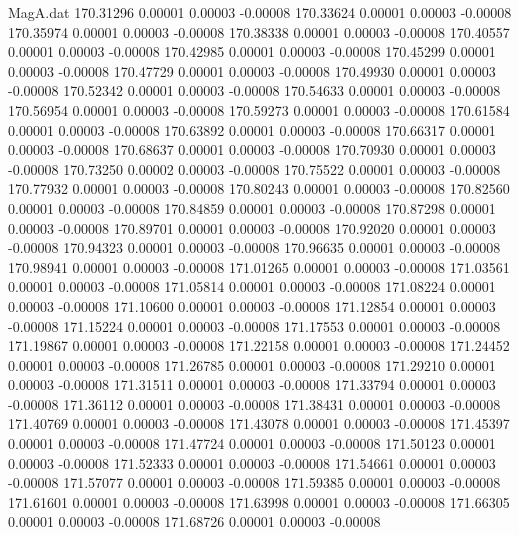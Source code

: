 \begin{filecontents}{MagA.dat}
 170.31296    0.00001    0.00003   -0.00008
 170.33624    0.00001    0.00003   -0.00008
 170.35974    0.00001    0.00003   -0.00008
 170.38338    0.00001    0.00003   -0.00008
 170.40557    0.00001    0.00003   -0.00008
 170.42985    0.00001    0.00003   -0.00008
 170.45299    0.00001    0.00003   -0.00008
 170.47729    0.00001    0.00003   -0.00008
 170.49930    0.00001    0.00003   -0.00008
 170.52342    0.00001    0.00003   -0.00008
 170.54633    0.00001    0.00003   -0.00008
 170.56954    0.00001    0.00003   -0.00008
 170.59273    0.00001    0.00003   -0.00008
 170.61584    0.00001    0.00003   -0.00008
 170.63892    0.00001    0.00003   -0.00008
 170.66317    0.00001    0.00003   -0.00008
 170.68637    0.00001    0.00003   -0.00008
 170.70930    0.00001    0.00003   -0.00008
 170.73250    0.00002    0.00003   -0.00008
 170.75522    0.00001    0.00003   -0.00008
 170.77932    0.00001    0.00003   -0.00008
 170.80243    0.00001    0.00003   -0.00008
 170.82560    0.00001    0.00003   -0.00008
 170.84859    0.00001    0.00003   -0.00008
 170.87298    0.00001    0.00003   -0.00008
 170.89701    0.00001    0.00003   -0.00008
 170.92020    0.00001    0.00003   -0.00008
 170.94323    0.00001    0.00003   -0.00008
 170.96635    0.00001    0.00003   -0.00008
 170.98941    0.00001    0.00003   -0.00008
 171.01265    0.00001    0.00003   -0.00008
 171.03561    0.00001    0.00003   -0.00008
 171.05814    0.00001    0.00003   -0.00008
 171.08224    0.00001    0.00003   -0.00008
 171.10600    0.00001    0.00003   -0.00008
 171.12854    0.00001    0.00003   -0.00008
 171.15224    0.00001    0.00003   -0.00008
 171.17553    0.00001    0.00003   -0.00008
 171.19867    0.00001    0.00003   -0.00008
 171.22158    0.00001    0.00003   -0.00008
 171.24452    0.00001    0.00003   -0.00008
 171.26785    0.00001    0.00003   -0.00008
 171.29210    0.00001    0.00003   -0.00008
 171.31511    0.00001    0.00003   -0.00008
 171.33794    0.00001    0.00003   -0.00008
 171.36112    0.00001    0.00003   -0.00008
 171.38431    0.00001    0.00003   -0.00008
 171.40769    0.00001    0.00003   -0.00008
 171.43078    0.00001    0.00003   -0.00008
 171.45397    0.00001    0.00003   -0.00008
 171.47724    0.00001    0.00003   -0.00008
 171.50123    0.00001    0.00003   -0.00008
 171.52333    0.00001    0.00003   -0.00008
 171.54661    0.00001    0.00003   -0.00008
 171.57077    0.00001    0.00003   -0.00008
 171.59385    0.00001    0.00003   -0.00008
 171.61601    0.00001    0.00003   -0.00008
 171.63998    0.00001    0.00003   -0.00008
 171.66305    0.00001    0.00003   -0.00008
 171.68726    0.00001    0.00003   -0.00008

\end{filecontents}
